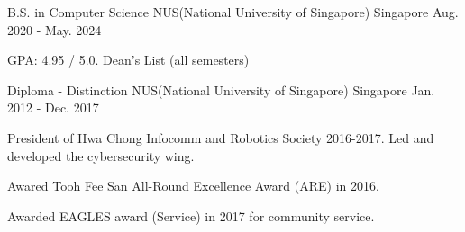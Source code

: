 

\begin{cventries}

  \cventry
    {B.S. in Computer Science} %
    {NUS(National University of Singapore)} %
    {Singapore} %
    {Aug. 2020 - May. 2024} %
    {
      \begin{cvitems} %
      \item {GPA: 4.95 / 5.0. Dean's List (all semesters)}
      \end{cvitems}
    }

  \cventry
    {Diploma - Distinction} %
    {NUS(National University of Singapore)} %
    {Singapore} %
    {Jan. 2012 - Dec. 2017} %
    {
      \begin{cvitems} %
      \item {President of Hwa Chong Infocomm and Robotics Society 2016-2017. Led and developed the cybersecurity wing.}
      \item {Awared Tooh Fee San All-Round Excellence Award (ARE) in 2016.}
      \item {Awarded EAGLES award (Service) in 2017 for community service.}
      \end{cvitems}
    }

\end{cventries}
